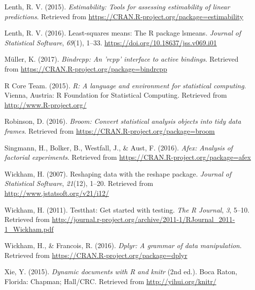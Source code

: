 \documentclass[
  man,floatsintext]{apa6}
\begin{document}
\begin{CSLReferences}
Lenth, R. V. (2015). \emph{Estimability: Tools for assessing estimability of linear predictions}. Retrieved from \url{https://CRAN.R-project.org/package=estimability}

Lenth, R. V. (2016). Least-squares means: The {R} package {lsmeans}. \emph{Journal of Statistical Software}, \emph{69}(1), 1--33. \url{https://doi.org/10.18637/jss.v069.i01}

Müller, K. (2017). \emph{Bindrcpp: An 'rcpp' interface to active bindings}. Retrieved from \url{https://CRAN.R-project.org/package=bindrcpp}

R Core Team. (2015). \emph{R: A language and environment for statistical computing}. Vienna, Austria: R Foundation for Statistical Computing. Retrieved from \url{http://www.R-project.org/}

Robinson, D. (2016). \emph{Broom: Convert statistical analysis objects into tidy data frames}. Retrieved from \url{https://CRAN.R-project.org/package=broom}

Singmann, H., Bolker, B., Westfall, J., \& Aust, F. (2016). \emph{Afex: Analysis of factorial experiments}. Retrieved from \url{https://CRAN.R-project.org/package=afex}

Wickham, H. (2007). Reshaping data with the {reshape} package. \emph{Journal of Statistical Software}, \emph{21}(12), 1--20. Retrieved from \url{http://www.jstatsoft.org/v21/i12/}

Wickham, H. (2011). Testthat: Get started with testing. \emph{The R Journal}, \emph{3}, 5--10. Retrieved from \url{http://journal.r-project.org/archive/2011-1/RJournal_2011-1_Wickham.pdf}

Wickham, H., \& Francois, R. (2016). \emph{Dplyr: A grammar of data manipulation}. Retrieved from \url{https://CRAN.R-project.org/package=dplyr}

Xie, Y. (2015). \emph{Dynamic documents with {R} and knitr} (2nd ed.). Boca Raton, Florida: Chapman; Hall/CRC. Retrieved from \url{http://yihui.org/knitr/}

\end{CSLReferences}
\end{document}
